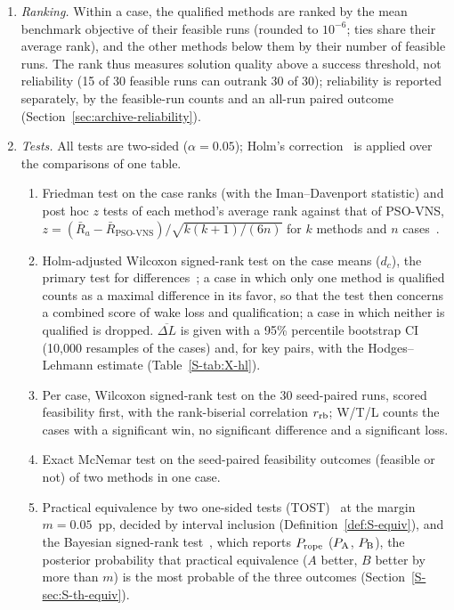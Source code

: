 \begin{enumerate}
\item \emph{Ranking.} Within a case, the qualified methods are ranked by the mean benchmark objective of their feasible runs (rounded to $10^{-6}$; ties share their average rank), and the other methods below them by their number of feasible runs. The rank thus measures solution quality above a success threshold, not reliability (15 of 30 feasible runs can outrank 30 of 30); reliability is reported separately, by the feasible-run counts and an all-run paired outcome (Section~\ref{sec:archive-reliability}).
\item \emph{Tests.} All tests are two-sided ($\alpha=0.05$); Holm's correction~\cite{Holm1979} is applied over the comparisons of one table.
\begin{enumerate}
\item[(a)] Friedman test on the case ranks (with the Iman--Davenport statistic) and post hoc $z$ tests of each method's average rank against that of PSO-VNS, $z=(\bar R_a-\bar R_{\text{PSO-VNS}})/\sqrt{k(k+1)/(6n)}$ for $k$ methods and $n$ cases~\cite{Demsar2006,Derrac2011,LaTorre2021}.
\item[(b)] Holm-adjusted Wilcoxon signed-rank test on the case means ($d_c$), the primary test for differences~\cite{Benavoli2016}; a case in which only one method is qualified counts as a maximal difference in its favor, so that the test then concerns a combined score of wake loss and qualification; a case in which neither is qualified is dropped. $\overline{\Delta L}$ is given with a 95\% percentile bootstrap CI (10{,}000 resamples of the cases) and, for key pairs, with the Hodges--Lehmann estimate (Table~\ref{S-tab:X-hl}).
\item[(c)] Per case, Wilcoxon signed-rank test on the 30 seed-paired runs, scored feasibility first, with the rank-biserial correlation $r_{\rm rb}$; W/T/L counts the cases with a significant win, no significant difference and a significant loss.
\item[(d)] Exact McNemar test on the seed-paired feasibility outcomes (feasible or not) of two methods in one case.
\item[(e)] Practical equivalence by two one-sided tests (TOST)~\cite{Lakens2017} at the margin $m=0.05$~pp, decided by interval inclusion (Definition~\ref{def:S-equiv}), and the Bayesian signed-rank test~\cite{Benavoli2017}, which reports $P_{\rm rope}$ ($P_{\rm A}$, $P_{\rm B}$), the posterior probability that practical equivalence ($A$ better, $B$ better by more than $m$) is the most probable of the three outcomes (Section~\ref{S-sec:S-th-equiv}).

\end{enumerate}
\end{enumerate}
